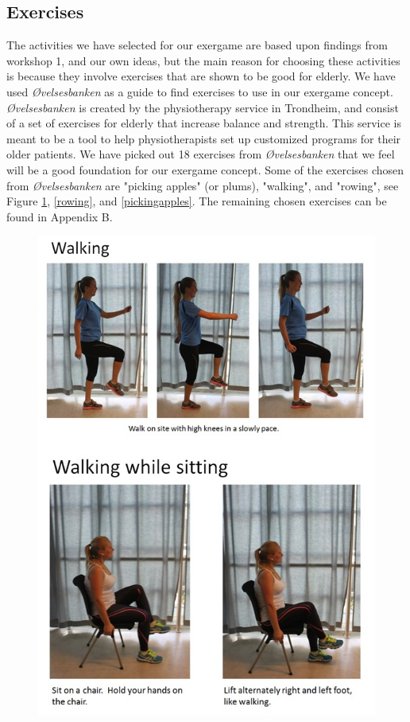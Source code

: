 \subsection{Exercises}
The activities we have selected for our exergame are based upon findings from workshop 1, and our own ideas, but the main reason for choosing these activities is because they involve exercises that are shown to be good for elderly. We have used \emph{Øvelsesbanken} \cite{eldretrening} as a guide to find exercises to use in our exergame concept. \emph{Øvelsesbanken} is created by the physiotherapy service in Trondheim, and consist of a set of exercises for elderly that increase balance and strength. This service is meant to be a tool to help physiotherapists set up customized programs for their older patients. We have picked out 18 exercises from \emph{Øvelsesbanken} that we feel will be a good foundation for our exergame concept. Some of the exercises chosen from \emph{Øvelsesbanken} are "picking apples" (or plums), "walking", and "rowing", see Figure \ref{walking}, \ref{rowing}, and \ref{pickingapples}. The remaining chosen exercises can be found in Appendix B. 

\begin{figure} [H]
\centering
\includegraphics[scale=0.7]{Walking.jpg}
\caption[Exercise - walking]{}
\label{walking}
\end{figure} 

